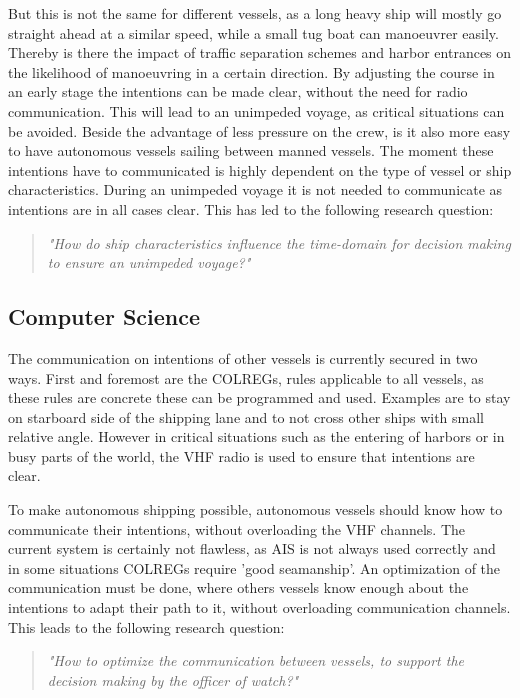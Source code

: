 But this is not the same for different vessels, as a long heavy ship will mostly go straight ahead at a similar speed, while a small tug boat can manoeuvrer easily. Thereby is there the impact of traffic separation schemes and harbor entrances on the likelihood of manoeuvring in a certain direction. 
By adjusting the course in an early stage the intentions can be made clear, without the need for radio communication. This will lead to an unimpeded voyage, as critical situations can be avoided. Beside the advantage of less pressure on the crew, is it also more easy to have autonomous vessels sailing between manned vessels.
The moment these intentions have to communicated is highly dependent on the type of vessel or ship characteristics. During an unimpeded voyage it is not needed to communicate as intentions are in all cases clear. This has led to the following research question:

\begin{quotation}
	\Large
	\emph{"How do ship characteristics influence the time-domain for decision making to ensure an unimpeded voyage?"} 
\end{quotation}

\subsection{Computer Science}
The communication on intentions of other vessels is currently secured in two ways. First and foremost are the COLREGs, rules applicable to all vessels, as these rules are concrete these can be programmed and used. Examples are to stay on starboard side of the shipping lane and to not cross other ships with small relative angle. However in critical situations such as the entering of harbors or in busy parts of the world, the VHF radio is used to ensure that intentions are clear.

To make autonomous shipping possible, autonomous vessels should know how to communicate their intentions, without overloading the VHF channels. The current system is certainly not flawless, as \ac{AIS} is not always used correctly and in some situations \ac{COLREGs} require 'good seamanship'.
An optimization of the communication must be done, where others vessels know enough about the intentions to adapt their path to it, without overloading communication channels.
This leads to the following research question:

\begin{quotation}
	\Large
	\emph{"How to optimize the communication between vessels, to support the decision making by the officer of watch?"}
\end{quotation}


